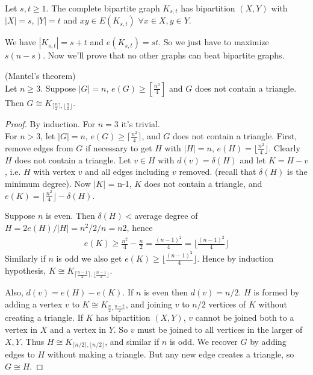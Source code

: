 \documentclass[a4paper]{article}
\begin{document}
\begin{defi}
Let $s,t \geq 1$. The complete bipartite graph $K_{s,t}$ has bipartition $(X,Y)$ with $|X| = s$, $|Y| = t$ and $xy \in E(K_{s,t})$ $\forall x \in X, y \in Y$.
\end{defi}

We have $|K_{s,t}| = s+t$ and $e(K_{s,t}) = st$. So we just have to maximize $s(n-s)$. Now we'll prove that no other graphs can beat bipartite graphs.

\begin{thm} (Mantel's theorem)\\
Let $n \geq 3$. Suppose $|G| = n$, $e(G) \geq [\frac{n^2}{4}]$ and $G$ does not contain a triangle. Then $G \cong K_{\lceil \frac{n}{2} \rceil, \lfloor \frac{n}{2} \rfloor}$.
\begin{proof}
By induction. For $n=3$ it's trivial.\\
For $n>3$, let $|G| = n$, $e(G) \geq \lceil \frac{n^2}{4} \rceil$, and $G$ does not contain a triangle. First, remove edges from $G$ if necessary to get $H$ with $|H| = n$, $e(H) = \lfloor \frac{n^2}{4} \rfloor$. Clearly $H$ does not contain a triangle. Let $v \in H$ with $d(v) = \delta(H)$ and let $K = H-v$, i.e. $H$ with vertex $v$ and all edges including $v$ removed. (recall that $\delta(H)$ is the minimum degree). Now $|K|$ = n-1, $K$ does not contain a triangle, and $e(K) = \lfloor \frac{n^2}{4} \rfloor - \delta(H)$.

Suppose $n$ is even. Then $\delta(H)<$average degree of $H = 2e(H)/|H| = n^2/2/n = n2$, hence
\begin{equation*}
\begin{aligned}
e(K) \geq \frac{n^2}{4} - \frac{n}{2} = \frac{(n-1)^2}{4} = \lfloor \frac{(n-1)^2}{4}\rfloor
\end{aligned}
\end{equation*}
Similarly if $n$ is odd we also get $e(K) \geq \lfloor \frac{(n-1)^2}{4} \rfloor$. Hence by induction hypothesis, $K \cong K_{\lceil \frac{n-1}{2} \rceil, \lfloor \frac{n-1}{2} \rfloor}$.

Also, $d(v) = e(H) -e(K)$. If $n$ is even then $d(v) = n/2$. $H$ is formed by adding a vertex $v$ to $K \cong K_{\frac{n}{2},\frac{n-2}{2}}$, and joining $v$ to $n/2$ vertices of $K$ without creating a triangle. If $K$ has bipartition $(X,Y)$, $v$ cannot be joined both to a vertex in $X$ and a vertex in $Y$. So $v$ must be joined to all vertices in the larger of $X,Y$. Thus $H \cong K_{\lceil n/2 \rceil, \lfloor n/2 \rfloor}$, and similar if $n$ is odd. We recover $G$ by adding edges to $H$ without making a triangle. But any new edge creates a triangle, so $G \cong H$.
\end{proof}
\end{thm}
\end{document}
